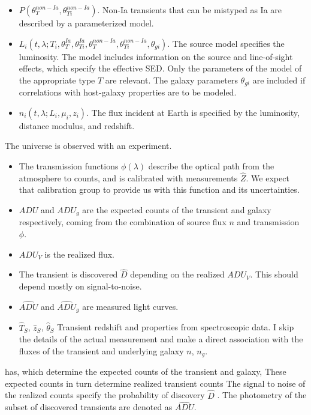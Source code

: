 \documentclass[preprint]{aastex}
\begin{document}
\begin{itemize}
\item $P(\theta_T^{non-Ia}, \theta_{Ti}^{non-Ia})$.  Non-Ia transients
that can be mistyped as Ia are described by a parameterized model.
\item $L_i(t,\lambda; T_i, \theta_T^{Ia}, \theta_{Ti}^{Ia}, \theta_T^{non-Ia}, \theta_{Ti}^{non-Ia},
\theta_{gi})$.  The source model specifies
the luminosity. The  model includes  information on the
source and line-of-sight effects, which specify the effective SED.   Only the
parameters of the model of the appropriate type $T$ are relevant.  The galaxy parameters
$\theta_{gi}$ are included if correlations with host-galaxy properties are to be modeled.
\item $n_i(t,\lambda; L_i, \mu_i, z_i)$.  The  flux incident at Earth
is specified by the luminosity, distance modulus, and redshift.
\end{itemize}

The universe is observed with an experiment.
\begin{itemize}
\item The transmission functions $\phi(\lambda)$ describe the optical path from the
atmosphere to counts, and is calibrated with measurements $\hat{Z}$.  We expect
that calibration group to provide us with this function and its uncertainties. 
\item $\mathit{ADU}$ and
$\mathit{ADU}_g$ are the expected counts of the transient and galaxy respectively,
coming from the combination of source flux $n$ and transmission $\phi$.
\item $\mathit{ADU}_V$ is the realized flux.
\item The transient is discovered $\hat{D}$ depending on the realized $\mathit{ADU}_V$.
This should depend mostly on signal-to-noise.
\item $\hat{\mathit{ADU}}$ and
$\hat{\mathit{ADU}}_g$ are measured light curves.
\item $\hat{T}_S$, $\hat{z}_S$, $\hat{\theta}_S$ Transient redshift and properties from
spectroscopic data. I skip the details of the actual measurement  and make a direct association
with the fluxes of the transient and underlying galaxy $n$, $n_g$.

\end{itemize}
has, which determine the expected counts of the transient and galaxy,    These expected counts in turn determine realized  transient counts 
The signal to noise of the realized counts specify the probability of discovery
$\hat{D}$ .    The photometry of the subset of discovered transients
are denoted as $\hat{\mathit{ADU}}$.
\end{document}
